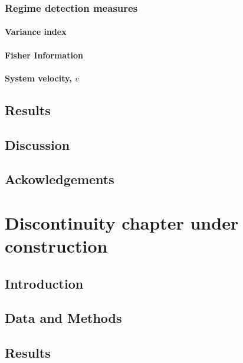\documentclass[12pt,twoside,openany]{reedthesis}
\begin{document}
\subsection{Regime detection measures}\label{regime-detection-measures}

\subsubsection{Variance index}\label{variance-index}

\subsubsection{Fisher Information}\label{fisher-information}

\subsubsection{\texorpdfstring{System velocity,
\(v\)}{System velocity, v}}\label{system-velocity-v}

\section{Results}\label{results-2}

\section{Discussion}\label{discussion-3}

\section{Ackowledgements}\label{ackowledgements}

\chapter{Discontinuity chapter under construction}\label{discontinuity}

\section{Introduction}\label{introduction-5}

\section{Data and Methods}\label{data-and-methods-2}

\section{Results}\label{results-3}
\end{document}
